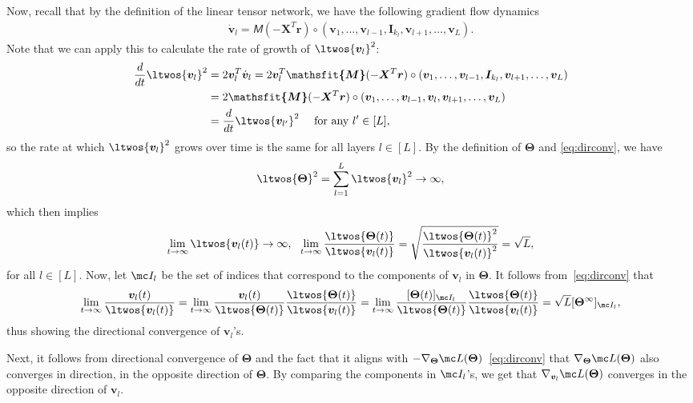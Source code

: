 \documentclass{article} %
\def\vr{{\bm{r}}}
\def\vv{{\bm{v}}}
\def\mI{{\bm{I}}}
\def\mX{{\bm{X}}}
\newcommand{\tens}[1]{\bm{\mathsfit{#1}}}
\def\tM{{\tens{M}}}
\newcommand{\bTheta}{\bm{\Theta}}
\begin{document}
Now, recall that by the definition of the linear tensor network, we have the following gradient flow dynamics
\begin{align*}
    \dot \vv_l
    = \tM(-\mX^T\vr) \circ (\vv_1, \dots, \vv_{l-1}, \mI_{k_l}, \vv_{l+1}, \dots, \vv_L).
\end{align*}
Note that we can apply this to calculate the rate of growth of $\ltwos{\vv_l}^2$:
\begin{align*}
    \frac{d}{dt} \ltwos{\vv_l}^2
    &= 2 \vv_l^T \dot \vv_l
    = 2\vv_l^T \tM(-\mX^T\vr) \circ (\vv_1, \dots, \vv_{l-1}, \mI_{k_l}, \vv_{l+1}, \dots, \vv_L)\\
    &= 2 \tM(-\mX^T\vr) \circ (\vv_1, \dots, \vv_{l-1}, \vv_{l}, \vv_{l+1}, \dots, \vv_L)\\
    &= \frac{d}{dt} \ltwos{\vv_{l'}}^2 \quad\text{ for any $l' \in [L]$, }
\end{align*}
so the rate at which $\ltwos{\vv_l}^2$ grows over time is the same for all layers $l \in [L]$. By the definition of $\bTheta$ and \eqref{eq:dirconv}, we have 
\begin{equation*}
    \ltwos{\bTheta}^2 = \sum_{l=1}^L \ltwos{\vv_l}^2 \to \infty,
\end{equation*}
which then implies
\begin{equation*}
    \lim_{t\to\infty} \ltwos{\vv_l(t)} \to \infty,~~
    \lim_{t\to\infty} \frac{\ltwos{\bTheta(t)}}{\ltwos{\vv_l(t)}}
    = \sqrt{\frac{\ltwos{\bTheta(t)}^2}{\ltwos{\vv_l(t)}^2}}
    = \sqrt{L},
\end{equation*}
for all $l \in [L]$.
Now, let $\mc I_l$ be the set of indices that correspond to the components of $\vv_l$ in $\bTheta$. 
It follows from~\eqref{eq:dirconv} that
\begin{align*}
    \lim_{t \to \infty}
    \frac{\vv_l(t)}{\ltwos{\vv_l(t)}}
    =
    \lim_{t \to \infty}
    \frac{\vv_l(t)}{\ltwos{\bTheta(t)}}
    \frac{\ltwos{\bTheta(t)}}{\ltwos{\vv_l(t)}}
    =
    \lim_{t \to \infty}
    \frac{[\bTheta(t)]_{\mc I_l}}{\ltwos{\bTheta(t)}}
    \frac{\ltwos{\bTheta(t)}}{\ltwos{\vv_l(t)}}
    =
    \sqrt{L} [\bTheta^\infty]_{\mc I_l},
\end{align*}
thus showing the directional convergence of $\vv_l$'s.

Next, it follows from directional convergence of $\bTheta$ and the fact that it aligns with $-\nabla_{\bTheta} \mc L(\bTheta)$~\eqref{eq:dirconv} that $\nabla_{\bTheta} \mc L(\bTheta)$ also converges in direction, in the opposite direction of $\bTheta$. By comparing the components in $\mc I_l$'s, we get that $\nabla_{\vv_l} \mc L(\bTheta)$ converges in the opposite direction of $\vv_l$.
\end{document}

